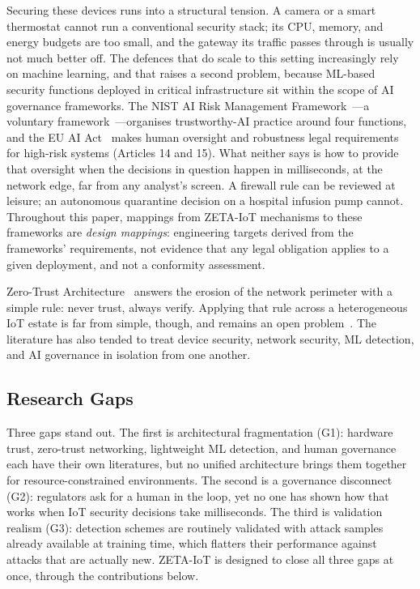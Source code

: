 \documentclass[sigconf,review,anonymous]{acmart}
\begin{document}
Securing these devices runs into a structural tension. A camera or a smart thermostat cannot run a conventional security stack; its CPU, memory, and energy budgets are too small, and the gateway its traffic passes through is usually not much better off. The defences that do scale to this setting increasingly rely on machine learning, and that raises a second problem, because ML-based security functions deployed in critical infrastructure sit within the scope of AI governance frameworks. The NIST AI Risk Management Framework~\cite{nistairmf}---a voluntary framework~\cite{nistairmfvoluntary}---organises trustworthy-AI practice around four functions, and the EU AI Act~\cite{euaiact} makes human oversight and robustness legal requirements for high-risk systems (Articles 14 and 15). What neither says is how to provide that oversight when the decisions in question happen in milliseconds, at the network edge, far from any analyst's screen. A firewall rule can be reviewed at leisure; an autonomous quarantine decision on a hospital infusion pump cannot. Throughout this paper, mappings from ZETA-IoT mechanisms to these frameworks are \emph{design mappings}: engineering targets derived from the frameworks' requirements, not evidence that any legal obligation applies to a given deployment, and not a conformity assessment.

Zero-Trust Architecture~\cite{nist800207} answers the erosion of the network perimeter with a simple rule: never trust, always verify. Applying that rule across a heterogeneous IoT estate is far from simple, though, and remains an open problem~\cite{syed2022zta}. The literature has also tended to treat device security, network security, ML detection, and AI governance in isolation from one another.

\subsection{Research Gaps}

Three gaps stand out. The first is architectural fragmentation (G1): hardware trust, zero-trust networking, lightweight ML detection, and human governance each have their own literatures, but no unified architecture brings them together for resource-constrained environments. The second is a governance disconnect (G2): regulators ask for a human in the loop, yet no one has shown how that works when IoT security decisions take milliseconds. The third is validation realism (G3): detection schemes are routinely validated with attack samples already available at training time, which flatters their performance against attacks that are actually new. ZETA-IoT is designed to close all three gaps at once, through the contributions below.
\end{document}
